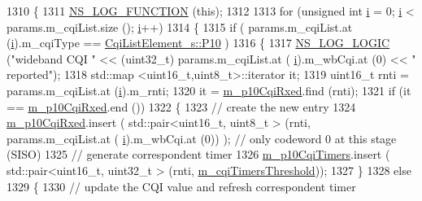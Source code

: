 \begin{DoxyCode}
1310 \{
1311   \hyperlink{log-macros-disabled_8h_a90b90d5bad1f39cb1b64923ea94c0761}{NS\_LOG\_FUNCTION} (\textcolor{keyword}{this});
1312 
1313   \textcolor{keywordflow}{for} (\textcolor{keywordtype}{unsigned} \textcolor{keywordtype}{int} \hyperlink{bernuolliDistribution_8m_a6f6ccfcf58b31cb6412107d9d5281426}{i} = 0; \hyperlink{bernuolliDistribution_8m_a6f6ccfcf58b31cb6412107d9d5281426}{i} < params.m\_cqiList.size (); \hyperlink{bernuolliDistribution_8m_a6f6ccfcf58b31cb6412107d9d5281426}{i}++)
1314     \{
1315       \textcolor{keywordflow}{if} ( params.m\_cqiList.at (\hyperlink{bernuolliDistribution_8m_a6f6ccfcf58b31cb6412107d9d5281426}{i}).m\_cqiType == \hyperlink{structns3_1_1CqiListElement__s_a8f1bd827fd9842e7c07e39265d88299aa9db5a80433fbf06a4c98935e28ad26e8}{CqiListElement\_s::P10} )
1316         \{
1317           \hyperlink{group__logging_ga88acd260151caf2db9c0fc84997f45ce}{NS\_LOG\_LOGIC} (\textcolor{stringliteral}{"wideband CQI "} <<  (uint32\_t) params.m\_cqiList.at (
      \hyperlink{bernuolliDistribution_8m_a6f6ccfcf58b31cb6412107d9d5281426}{i}).m\_wbCqi.at (0) << \textcolor{stringliteral}{" reported"});
1318           std::map <uint16\_t,uint8\_t>::iterator it;
1319           uint16\_t rnti = params.m\_cqiList.at (\hyperlink{bernuolliDistribution_8m_a6f6ccfcf58b31cb6412107d9d5281426}{i}).m\_rnti;
1320           it = \hyperlink{classns3_1_1FdMtFfMacScheduler_a626d9dafd0c21eea303f37c113815a12}{m\_p10CqiRxed}.find (rnti);
1321           \textcolor{keywordflow}{if} (it == \hyperlink{classns3_1_1FdMtFfMacScheduler_a626d9dafd0c21eea303f37c113815a12}{m\_p10CqiRxed}.end ())
1322             \{
1323               \textcolor{comment}{// create the new entry}
1324               \hyperlink{classns3_1_1FdMtFfMacScheduler_a626d9dafd0c21eea303f37c113815a12}{m\_p10CqiRxed}.insert ( std::pair<uint16\_t, uint8\_t > (rnti, params.m\_cqiList.at (
      \hyperlink{bernuolliDistribution_8m_a6f6ccfcf58b31cb6412107d9d5281426}{i}).m\_wbCqi.at (0)) ); \textcolor{comment}{// only codeword 0 at this stage (SISO)}
1325               \textcolor{comment}{// generate correspondent timer}
1326               \hyperlink{classns3_1_1FdMtFfMacScheduler_a5dc227f7ca1e00c530063e52ec1dcc69}{m\_p10CqiTimers}.insert ( std::pair<uint16\_t, uint32\_t > (rnti, 
      \hyperlink{classns3_1_1FdMtFfMacScheduler_a2594d67e25a125c89b90a5eba5e46cc9}{m\_cqiTimersThreshold}));
1327             \}
1328           \textcolor{keywordflow}{else}
1329             \{
1330               \textcolor{comment}{// update the CQI value and refresh correspondent timer}

\end{DoxyCode}
